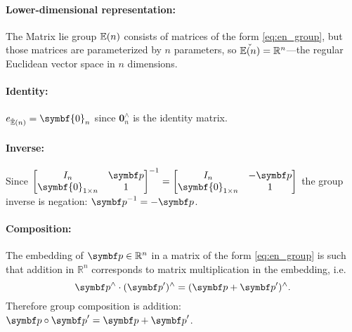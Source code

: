 \paragraph{Lower-dimensional representation:} The Matrix lie group ${\mathbb{E}(n)}$ consists of matrices of the form \eqref{eq:en_group}, but those matrices are parameterized by $n$ parameters, so $\check{{\mathbb{E}(n)}} = \mathbb{R}^n$---the regular Euclidean vector space in $n$ dimensions.

\paragraph{Identity:} $\id_{\cEn} = \symbf{0}_n$ since $\symbf{0}_n^\wedge$ is the identity matrix.

\paragraph{Inverse:} Since $\begin{bmatrix}
    I_n & \bp \\ \symbf{0}_{1 \times n} & 1
  \end{bmatrix}^{-1} = \begin{bmatrix}
    I_n & -\bp \\ \symbf{0}_{1 \times n} & 1
  \end{bmatrix}$ the group inverse is negation: $\bp^{-1} = - \bp$.

\paragraph{Composition:} The embedding of $\bp \in \mathbb{R}^n$ in a matrix of the form \eqref{eq:en_group} is such that addition in $\mathbb{R}^n$ corresponds to matrix multiplication in the embedding, i.e.
\begin{equation}
  \bp^{\wedge} \cdot (\bp')^{\wedge} = (\bp + \bp')^{\wedge}.
\end{equation}
Therefore group composition is addition: $\bp \circ \bp' = \bp + \bp'$.

